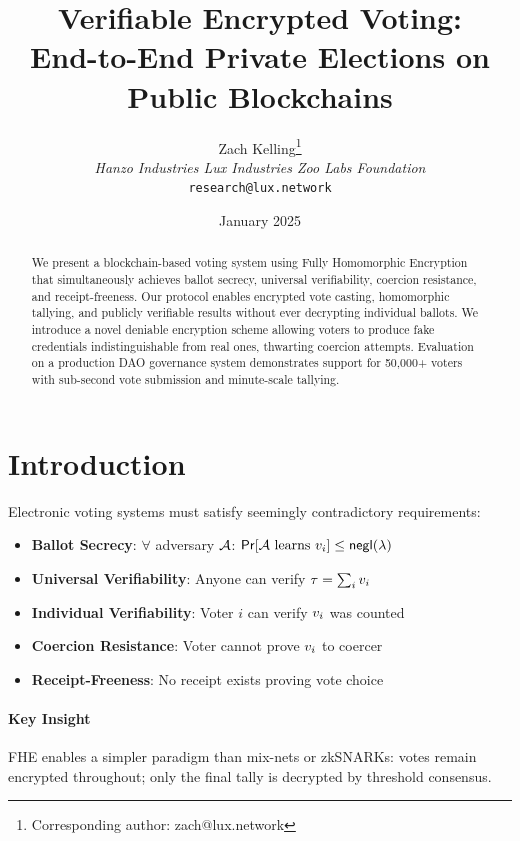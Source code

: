 \documentclass{../shared/luxfhe}
\title{\textbf{Verifiable Encrypted Voting:\\End-to-End Private Elections on Public Blockchains}}
\author{
    Zach Kelling\thanks{Corresponding author: zach@lux.network}\\
    \textit{Hanzo Industries \quad Lux Industries \quad Zoo Labs Foundation}\\
    \texttt{research@lux.network}
}
\date{January 2025}
\begin{document}
\maketitle
\luxcoverpage

\begin{abstract}
We present a blockchain-based voting system using Fully Homomorphic Encryption that simultaneously achieves ballot secrecy, universal verifiability, coercion resistance, and receipt-freeness. Our protocol enables encrypted vote casting, homomorphic tallying, and publicly verifiable results without ever decrypting individual ballots. We introduce a novel deniable encryption scheme allowing voters to produce fake credentials indistinguishable from real ones, thwarting coercion attempts. Evaluation on a production DAO governance system demonstrates support for 50,000+ voters with sub-second vote submission and minute-scale tallying.
\end{abstract}

\section{Introduction}

Electronic voting systems must satisfy seemingly contradictory requirements:

\begin{definition}
\begin{itemize}[noitemsep]
    \item \textbf{Ballot Secrecy}: $\forall$ adversary $\mathcal{A}$: $\mathsf{Pr}[\mathcal{A} \text{ learns } v_i] \leq \mathsf{negl}(\lambda)$
    \item \textbf{Universal Verifiability}: Anyone can verify $\tau = \sum_i v_i$
    \item \textbf{Individual Verifiability}: Voter $i$ can verify $v_i$ was counted
    \item \textbf{Coercion Resistance}: Voter cannot prove $v_i$ to coercer
    \item \textbf{Receipt-Freeness}: No receipt exists proving vote choice
\end{itemize}
\end{definition}

\paragraph{Key Insight} FHE enables a simpler paradigm than mix-nets or zkSNARKs: votes remain encrypted throughout; only the final tally is decrypted by threshold consensus.
\end{document}

